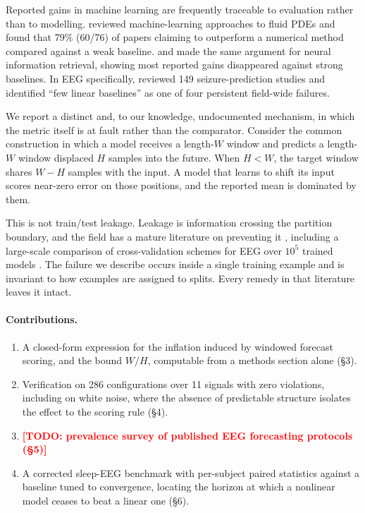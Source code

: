 \documentclass{article}
\newcommand{\TODO}[1]{\textcolor{red}{\textbf{[TODO: #1]}}}
\begin{document}
Reported gains in machine learning are frequently traceable to evaluation rather
than to modelling. \citet{mcgreivy2024} reviewed machine-learning approaches to
fluid PDEs and found that 79\% (60/76) of papers claiming to outperform a
numerical method compared against a weak baseline. \citet{lin2019} and
\citet{yang2019} made the same argument for neural information retrieval, showing
most reported gains disappeared against strong baselines. In EEG specifically,
\citet{wu2025} reviewed 149 seizure-prediction studies and identified ``few linear
baselines'' as one of four persistent field-wide failures.

We report a distinct and, to our knowledge, undocumented mechanism, in which the
metric itself is at fault rather than the comparator. Consider the common
construction in which a model receives a length-$W$ window and predicts a
length-$W$ window displaced $H$ samples into the future. When $H<W$, the target
window shares $W-H$ samples with the input. A model that learns to shift its input
scores near-zero error on those positions, and the reported mean is dominated by
them.

This is not train/test leakage. Leakage is information crossing the partition
boundary, and the field has a mature literature on preventing it
\citep{bernett2024,apicella2024}, including a large-scale comparison of
cross-validation schemes for EEG over $10^5$ trained models \citep{delpup2025}.
The failure we describe occurs inside a single training example and is invariant
to how examples are assigned to splits. Every remedy in that literature leaves it
intact.

\paragraph{Contributions.}
\begin{enumerate}\itemsep2pt
\item A closed-form expression for the inflation induced by windowed forecast
scoring, and the bound $W/H$, computable from a methods section alone (\S3).
\item Verification on 286 configurations over 11 signals with zero violations,
including on white noise, where the absence of predictable structure isolates the
effect to the scoring rule (\S4).
\item \TODO{prevalence survey of published EEG forecasting protocols (\S5)}
\item A corrected sleep-EEG benchmark with per-subject paired statistics against a
baseline tuned to convergence, locating the horizon at which a nonlinear model
ceases to beat a linear one (\S6).
\end{enumerate}
\end{document}
